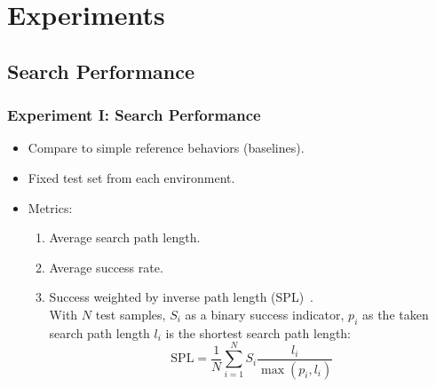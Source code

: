 \section{Experiments}

\subsection{Search Performance}

\begin{frame}
    \frametitle{Experiment I: Search Performance}

    \begin{itemize}
        \item Compare to simple reference behaviors (baselines).
        \item Fixed test set from each environment.
        \item Metrics:
        \begin{enumerate}
            \item Average search path length.
            \item Average success rate.
            \item Success weighted by inverse path length (SPL)~\cite{anderson_evaluation_2018}.\\
            With \(N\) test samples, \(S_i\) as a binary success indicator, \(p_i\) as the taken search path length \(l_i\) is the shortest search path length:
            \begin{equation*}
                \text{SPL} = \frac{1}{N} \sum_{i=1}^N S_i \frac{l_i}{\max(p_i,l_i)}
            \end{equation*}
        \end{enumerate}
    \end{itemize}


\end{frame}

